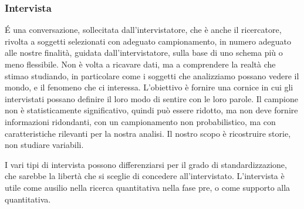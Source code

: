 \subsubsection{Intervista}
\'E una conversazione, sollecitata dall'intervistatore, che è anche il ricercatore, rivolta a soggetti selezionati con adeguato campionamento, in numero adeguato alle nostre finalità, guidata dall'intervistatore, sulla base di uno schema più o meno flessibile. Non è volta a ricavare dati, ma a comprendere la realtà che stimao studiando, in particolare come i soggetti che analizziamo possano vedere il mondo, e il fenomeno che ci interessa. L'obiettivo è fornire una cornice in cui gli intervistati possano definire il loro modo di sentire con le loro parole.
Il campione non è statisticamente significativo, quindi può essere ridotto, ma non deve fornire informazioni ridondanti, con un campionamento non probabilistico, ma con caratteristiche rilevanti per la nostra analisi. Il nostro scopo è ricostruire storie, non studiare variabili.

I vari tipi di intervista possono differenziarsi per il grado di standardizzazione, che sarebbe la libertà che si sceglie di concedere all'intervistato. L'intervista è utile come ausilio nella ricerca quantitativa nella fase pre, o come supporto alla quantitativa.

